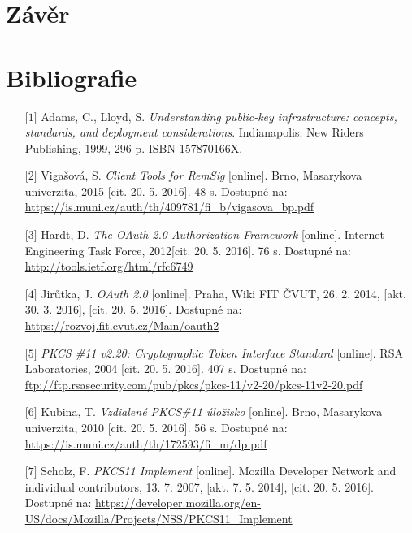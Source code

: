 \documentclass[]{fithesis3}
\begin{document}
\chapter{Závěr}



\chapter{Bibliografie}
{\flushleft
\begin{itemize}
	
	\item[$\mbox{[1]}$] Adams, C., Lloyd, S. \textit{Understanding public-key infrastructure:
concepts, standards, and deployment considerations}. Indianapolis:
New Riders Publishing, 1999, 296 p. ISBN 157870166X.

	\item[$\mbox{[2]}$] Vigašová, S. \textit{Client Tools for RemSig} [online]. Brno, Masarykova univerzita, 2015 [cit. 20. 5. 2016]. 48 s. Dostupné na: \url{https://is.muni.cz/auth/th/409781/fi_b/vigasova_bp.pdf}

	\item[$\mbox{[3]}$] Hardt, D. \textit{The OAuth 2.0 Authorization Framework} [online]. Internet Engineering Task Force, 2012[cit. 20. 5. 2016]. 76 s. Dostupné na: \url{http://tools.ietf.org/html/rfc6749}

	\item[$\mbox{[4]}$] Jirůtka, J. \textit{OAuth 2.0} [online]. Praha, Wiki FIT ČVUT, 26. 2. 2014, [akt. 30. 3. 2016], [cit. 20. 5. 2016].  Dostupné na: \url{https://rozvoj.fit.cvut.cz/Main/oauth2}

	\item[$\mbox{[5]}$] \textit{PKCS \#11 v2.20: Cryptographic Token Interface Standard} [online]. RSA Laboratories, 2004 [cit. 20. 5. 2016]. 407 s. Dostupné na: \url{ftp://ftp.rsasecurity.com/pub/pkcs/pkcs-11/v2-20/pkcs-11v2-20.pdf}

	\item[$\mbox{[6]}$] Kubina, T. \textit{Vzdialené PKCS\#11 úložisko} [online]. Brno, Masarykova univerzita, 2010 [cit. 20. 5. 2016]. 56 s. Dostupné na: \url{https://is.muni.cz/auth/th/172593/fi_m/dp.pdf}

	\item[$\mbox{[7]}$] Scholz, F. \textit{PKCS11 Implement} [online]. Mozilla Developer Network and individual contributors, 13. 7. 2007, [akt. 7. 5. 2014], [cit. 20. 5. 2016]. Dostupné na: \url{https://developer.mozilla.org/en-US/docs/Mozilla/Projects/NSS/PKCS11_Implement}


\end{itemize}}
\end{document}
